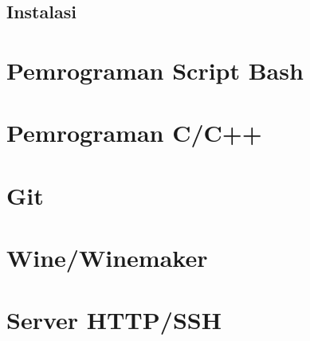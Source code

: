 \documentclass[12pt,]{article}
\begin{document}
	\subsection{Instalasi}
	
	\section{Pemrograman Script Bash}
	
	\section{Pemrograman C/C++}
	
	\section{Git}
	
	\section{Wine/Winemaker}
	
	\section{Server HTTP/SSH}
\end{document}
